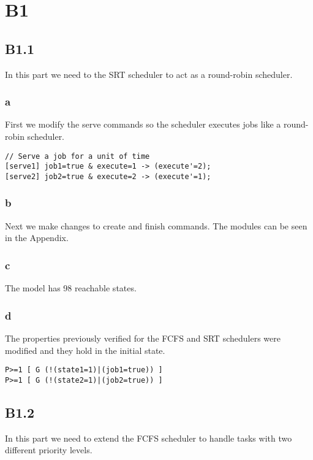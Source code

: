 \section{B1}

\subsection{B1.1}

In this part we need to the SRT scheduler to act as a round-robin scheduler.

\subsubsection{a}

First we modify the serve commands so the scheduler executes jobs like a round-robin scheduler.

\begin{verbatim}
// Serve a job for a unit of time
[serve1] job1=true & execute=1 -> (execute'=2);
[serve2] job2=true & execute=2 -> (execute'=1);
\end{verbatim}

\subsubsection{b}

Next we make changes to create and finish commands. The modules can be seen in the Appendix.

\subsubsection{c}
The model has 98 reachable states.

\subsubsection{d}
The properties previously verified for the FCFS and SRT schedulers were modified and they hold in the initial state.

\begin{verbatim}
P>=1 [ G (!(state1=1)|(job1=true)) ]
P>=1 [ G (!(state2=1)|(job2=true)) ]
\end{verbatim}

\subsection{B1.2}

In this part we need to extend the FCFS scheduler to handle tasks with two different priority levels.

